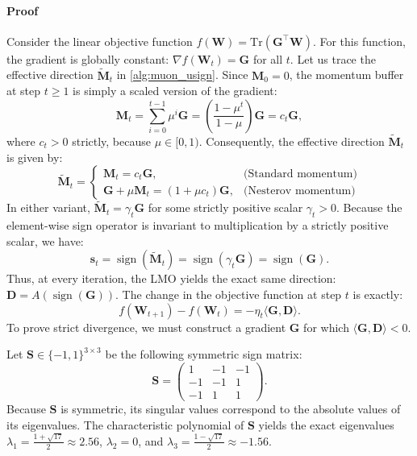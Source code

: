 \documentclass[letterpaper]{article} %
\begin{document}
\paragraph{Proof} 
Consider the linear objective function $f(\mathbf{W}) = \mathrm{Tr}(\mathbf{G}^\top \mathbf{W})$. 
For this function, the gradient is globally constant: $\nabla f(\mathbf{W}_t) = \mathbf{G}$ for all $t$. 
Let us trace the effective direction $\tilde{\mathbf{M}}_t$ in \cref{alg:muon_usign}.
Since $\mathbf{M}_0 = 0$, the momentum buffer at step $t \ge 1$ is simply a scaled version of the gradient:
\begin{equation}
\mathbf{M}_t = \sum_{i=0}^{t-1} \mu^i \mathbf{G} = \left(\frac{1-\mu^t}{1-\mu}\right) \mathbf{G} = c_t \mathbf{G},
\end{equation}
where $c_t > 0$ strictly, because $\mu \in [0, 1)$. 
Consequently, the effective direction $\tilde{\mathbf{M}}_t$ is given by:
\begin{equation}
\tilde{\mathbf{M}}_t = \begin{cases} 
\mathbf{M}_t = c_t \mathbf{G}, & \text{(Standard momentum)} \\
\mathbf{G} + \mu \mathbf{M}_t = (1 + \mu c_t) \mathbf{G}, & \text{(Nesterov momentum)}
\end{cases}
\end{equation}
In either variant, $\tilde{\mathbf{M}}_t = \gamma_t \mathbf{G}$ for some strictly positive scalar $\gamma_t > 0$. 
Because the element-wise sign operator is invariant to multiplication by a strictly positive scalar, we have:
\begin{equation}
\mathbf{s}_t = \operatorname{sign}(\tilde{\mathbf{M}}_t) = \operatorname{sign}(\gamma_t \mathbf{G}) = \operatorname{sign}(\mathbf{G}).
\end{equation}
Thus, at every iteration, the LMO yields the exact same direction: $\mathbf{D} = A(\operatorname{sign}(\mathbf{G}))$.
The change in the objective function at step $t$ is exactly:
\begin{equation}
f(\mathbf{W}_{t+1}) - f(\mathbf{W}_t) = -\eta_t \langle \mathbf{G}, \mathbf{D} \rangle.
\end{equation}
To prove strict divergence, we must construct a gradient $\mathbf{G}$ for which $\langle \mathbf{G}, \mathbf{D} \rangle < 0$.

Let $\mathbf{S} \in \{-1, 1\}^{3 \times 3}$ be the following symmetric sign matrix:
\begin{equation}
\mathbf{S} = \begin{pmatrix} 1 & -1 & -1 \\ -1 & -1 & 1 \\ -1 & 1 & 1 \end{pmatrix}.
\end{equation}
Because $\mathbf{S}$ is symmetric, its singular values correspond to the absolute values of its eigenvalues. The characteristic polynomial of $\mathbf{S}$ yields the exact eigenvalues $\lambda_1 = \frac{1+\sqrt{17}}{2} \approx 2.56$, $\lambda_2 = 0$, and $\lambda_3 = \frac{1-\sqrt{17}}{2} \approx -1.56$. 
\end{document}
